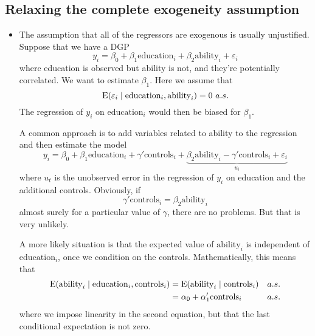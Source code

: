 \subsection{Relaxing the complete exogeneity assumption}

\begin{itemize}[leftmargin=0pt]

\item The assumption that all of the regressors are exogenous is
  usually unjustified. Suppose that we have a DGP
  \begin{equation*}
    y_i = \beta_0 + \beta_1 \text{education}_i
    + \beta_2 \text{ability}_i + \varepsilon_i
  \end{equation*}
  where education is observed but ability is not, and they're
  potentially correlated. We want to estimate $\beta_1$. Here we
  assume that
  \begin{equation*}
    \operatorname{E}(\varepsilon_i \mid \text{education}_i, \text{ability}_i) = 0 \ a.s.
  \end{equation*}
  The regression of $y_i$ on $\text{education}_i$ would then be biased
  for $\beta_1$.

  A common approach is to add variables related to ability to the
  regression and then estimate the model
  \begin{equation*}
    y_i = \beta_0 + \beta_1 \text{education}_i
    + \gamma'\text{controls}_i
    + \underbrace{\beta_2 \text{ability}_i - 
                  \gamma'\text{controls}_i + \varepsilon_i}_{u_i}
  \end{equation*}
  where $u_t$ is the unobserved error in the regression of $y_i$ on
  education and the additional controls. Obviously, if
  \begin{equation*}
    \gamma'\text{controls}_i = \beta_2 \text{ability}_i
  \end{equation*}
  almost surely for a particular value of $\gamma$, there are no
  problems. But that is very unlikely.

  A more likely situation is that the expected value of
  $\text{ability}_i$ is independent of $\text{education}_i$, once we
  condition on the controls. Mathematically, this means that
  \begin{align*}
    \operatorname{E}(\text{ability}_i \mid \text{education}_i, \text{controls}_i)
    &= \operatorname{E}(\text{ability}_i \mid \text{controls}_i) && a.s. \\
    &= \alpha_0 + \alpha_1'\text{controls}_i && a.s.
  \end{align*}
  where we impose linearity in the second equation, but that the last
  conditional expectation is not zero.


\end{itemize}
